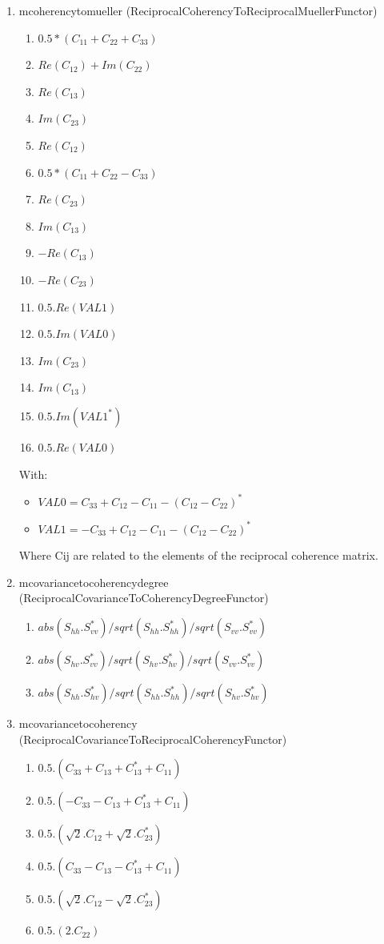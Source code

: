 \begin{enumerate}
\item mcoherencytomueller (ReciprocalCoherencyToReciprocalMuellerFunctor)
\begin{enumerate}
\item $ 0.5*( C_{11}+C_{22}+C_{33} ) $ 
\item $ Re(C_{12}) + Im(C_{22}) $ 
\item $ Re(C_{13}) $ 
\item $ Im(C_{23}) $ 
\item $ Re(C_{12}) $ 
\item $ 0.5*( C_{11}+C_{22}-C_{33} ) $ 
\item $ Re(C_{23}) $ 
\item $ Im(C_{13}) $ 
\item $ -Re(C_{13}) $ 
\item $ -Re(C_{23}) $
\item $ 0.5.Re(VAL1) $
\item $ 0.5.Im(VAL0) $
\item $ Im(C_{23}) $
\item $ Im(C_{13}) $
\item $ 0.5.Im(VAL1^{*}) $
\item $ 0.5.Re(VAL0) $
\end{enumerate}

With:
\begin{itemize} 
\item $ VAL0 = C_{33}+C_{12}-C_{11}-(C_{12}-C_{22})^{*}  $ 
\item $ VAL1 = -C_{33}+C_{12}-C_{11}-(C_{12}-C_{22})^{*} $ 
\end{itemize}

Where Cij are related to the elements of the reciprocal coherence matrix.
 
 
\item mcovariancetocoherencydegree (ReciprocalCovarianceToCoherencyDegreeFunctor)
\begin{enumerate}
\item $ abs(S_{hh}.S_{vv}^{*}) / sqrt(S_{hh}.S_{hh}^{*}) / sqrt(S_{vv}.S_{vv}^{*}) $ 
\item $ abs(S_{hv}.S_{vv}^{*}) / sqrt(S_{hv}.S_{hv}^{*}) / sqrt(S_{vv}.S_{vv}^{*}) $ 
\item $ abs(S_{hh}.S_{hv}^{*}) / sqrt(S_{hh}.S_{hh}^{*}) / sqrt(S_{hv}.S_{hv}^{*}) $
\end{enumerate}
 
\item mcovariancetocoherency (ReciprocalCovarianceToReciprocalCoherencyFunctor)
\begin{enumerate}
\item $ 0.5 . ( C_{33} + C_{13} + C_{13}^{*} + C_{11} ) $ 
\item $ 0.5 . ( -C_{33} - C_{13} + C_{13}^{*} + C_{11} ) $ 
\item $ 0.5 . ( \sqrt{2}.C_{12} + \sqrt{2}.C_{23}^{*} ) $ 
\item $ 0.5 . ( C_{33} - C_{13} - C_{13}^{*} + C_{11} ) $ 
\item $ 0.5 . ( \sqrt{2}.C_{12} - \sqrt{2}.C_{23}^{*} ) $ 
\item $ 0.5 . ( 2 . C_{22} ) $
\end{enumerate}


\end{enumerate}
